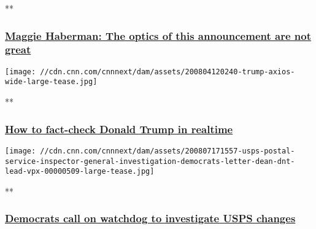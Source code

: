 **

\hypertarget{maggie-haberman-the-optics-of-this-announcement-are-not-great}{%
\subsubsection{\texorpdfstring{\href{/videos/politics/2020/08/08/haberman-trump-stimulus-executive-orders-bad-optics-backfire-sot-ac360-vpx.cnn/video/playlists/this-week-in-politics/}{Maggie
Haberman: The optics of this announcement are not
great}}{Maggie Haberman: The optics of this announcement are not great}}\label{maggie-haberman-the-optics-of-this-announcement-are-not-great}}

\href{/videos/politics/2020/08/08/donald-trump-realtime-fact-checking-facts-first-orig-vf.cnn/video/playlists/this-week-in-politics/}{}

\texttt{[image: //cdn.cnn.com/cnnnext/dam/assets/200804120240-trump-axios-wide-large-tease.jpg]}

**

\hypertarget{how-to-fact-check-donald-trump-in-realtime}{%
\subsubsection{\texorpdfstring{\href{/videos/politics/2020/08/08/donald-trump-realtime-fact-checking-facts-first-orig-vf.cnn/video/playlists/this-week-in-politics/}{How
to fact-check Donald Trump in
realtime}}{How to fact-check Donald Trump in realtime}}\label{how-to-fact-check-donald-trump-in-realtime}}

\href{/videos/politics/2020/08/07/usps-postal-service-inspector-general-investigation-democrats-letter-dean-dnt-lead-vpx.cnn/video/playlists/this-week-in-politics/}{}

\texttt{[image: //cdn.cnn.com/cnnnext/dam/assets/200807171557-usps-postal-service-inspector-general-investigation-democrats-letter-dean-dnt-lead-vpx-00000509-large-tease.jpg]}

**

\hypertarget{democrats-call-on-watchdog-to-investigate-usps-changes}{%
\subsubsection{\texorpdfstring{\href{/videos/politics/2020/08/07/usps-postal-service-inspector-general-investigation-democrats-letter-dean-dnt-lead-vpx.cnn/video/playlists/this-week-in-politics/}{Democrats
call on watchdog to investigate USPS
changes}}{Democrats call on watchdog to investigate USPS changes}}\label{democrats-call-on-watchdog-to-investigate-usps-changes}}

